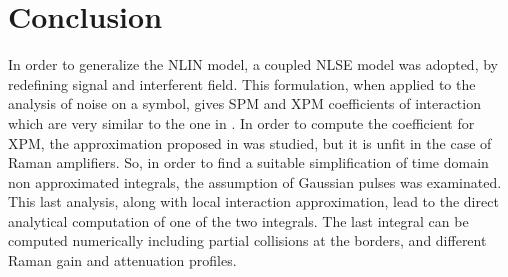 \documentclass[10pt, lettersize, journal, onecolumn]{IEEEtran}
\begin{document}
\begin{comment}
Quindi dobbiamo verificare la seguente uguaglianza
\begin{equation}
	U_0 \sqrt{\dfrac{1+iD(z)}{1+D^2(z)}} \exp\left[-\dfrac{t^2}{2T_0^2} \dfrac{1+iD(z)}{1+D^2(z)}\right]  \stackrel{?}{=}  U_0 \sqrt{\frac{i}{2\pi D(z)}} \exp\left[-\dfrac{t^2}{2T_0^2} \left(\dfrac{1}{D^2(z)}\right)\right]
\end{equation}
Queste espressioni non sembrano tuttavia combaciare esattamente. Possiamo approssimare il termine di sinistra, per $D(z)>>1$ con
\begin{equation}
	U_0 \sqrt{\dfrac{i}{D(z)}} \exp\left[-\dfrac{t^2}{2T_0^2} \dfrac{1}{D^2(z)}\right] {\color{darkred} \exp\left[-\dfrac{t^2}{2T_0^2} \dfrac{i}{D(z)}\right]}
\end{equation}
tuttavia si nota che manca un termine $2\pi$ a \textit{denominatore}, e l'esponenziale di fase \textit{scompare} dall'espressione.

\vspace{20pt}
La conclusione \textit{provvisoria} è che l'approssimazione non vale in maniera esatta, ed anzi la sua validità nel caso Gaussiano è da valutare in un'ulteriore analisi.
\end{comment}

\section{Conclusion}
In order to generalize the NLIN model, a coupled NLSE model was adopted, by redefining signal and interferent field. This formulation, when applied to the analysis of noise on a symbol, gives SPM and XPM coefficients of interaction which are very similar to the one in \cite{Dar_2013}. In order to compute the coefficient for XPM, the approximation proposed in \cite{Dar_2013} was studied, but it is unfit in the case of Raman amplifiers. So, in order to find a suitable simplification of time domain non approximated integrals, the assumption of Gaussian pulses was examinated. This last analysis, along with local interaction approximation, lead to the direct analytical computation of one of the two integrals. The last integral can be computed numerically including partial collisions at the borders, and different Raman gain and attenuation profiles.

\printbibliography

\hrulefill
\end{document}
